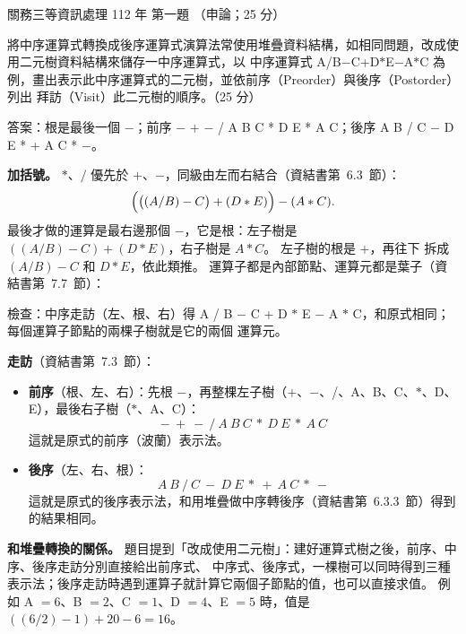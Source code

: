 \begin{pastexam}[label={px:gw3-112-ds-01}]{關務三等資訊處理 112 年 第一題}
（申論；25 分）

將中序運算式轉換成後序運算式演算法常使用堆疊資料結構，如相同問題，改成使用二元樹資料結構來儲存一中序運算式，以
中序運算式 A/B$-$C+D$*$E$-$A$*$C 為例，畫出表示此中序運算式的二元樹，並依前序（Preorder）與後序（Postorder）列出
拜訪（Visit）此二元樹的順序。（25 分）
\end{pastexam}

\begin{pastsoln}
答案：根是最後一個 $-$；前序 $-$ + $-$ / A B C * D E * A C；後序 A B / C $-$ D E * + A C * $-$。

\textbf{加括號。} $*$、$/$ 優先於 $+$、$-$，同級由左而右結合（資結書第~6.3~節）：
\[
\Bigl(\bigl((A / B) - C\bigr) + (D * E)\Bigr) - (A * C) .
\]
最後才做的運算是最右邊那個 $-$，它是根：左子樹是 $((A/B) - C) + (D*E)$，右子樹是 $A * C$。 左子樹的根是 $+$，再往下
拆成 $(A/B) - C$ 和 $D * E$，依此類推。 運算子都是內部節點、運算元都是葉子（資結書第~7.7~節）：
\begin{center}
\end{center}
檢查：中序走訪（左、根、右）得 A / B $-$ C + D $*$ E $-$ A $*$ C，和原式相同；每個運算子節點的兩棵子樹就是它的兩個
運算元。

\textbf{走訪}（資結書第~7.3~節）：
\begin{itemize}
\item \textbf{前序}（根、左、右）：先根 $-$，再整棵左子樹（$+$、$-$、/、A、B、C、$*$、D、E），最後右子樹（$*$、A、C）：
\[
-\ +\ -\ /\ A\ B\ C\ *\ D\ E\ *\ A\ C
\]
這就是原式的前序（波蘭）表示法。
\item \textbf{後序}（左、右、根）：
\[
A\ B\ /\ C\ -\ D\ E\ *\ +\ A\ C\ *\ -
\]
這就是原式的後序表示法，和用堆疊做中序轉後序（資結書第~6.3.3~節）得到的結果相同。
\end{itemize}

\textbf{和堆疊轉換的關係。} 題目提到「改成使用二元樹」：建好運算式樹之後，前序、中序、後序走訪分別直接給出前序式、
中序式、後序式，一棵樹可以同時得到三種表示法；後序走訪時遇到運算子就計算它兩個子節點的值，也可以直接求值。 例如
A $= 6$、B $= 2$、C $= 1$、D $= 4$、E $= 5$ 時，值是 $((6/2) - 1) + 20 - 6 = 16$。
\end{pastsoln}
